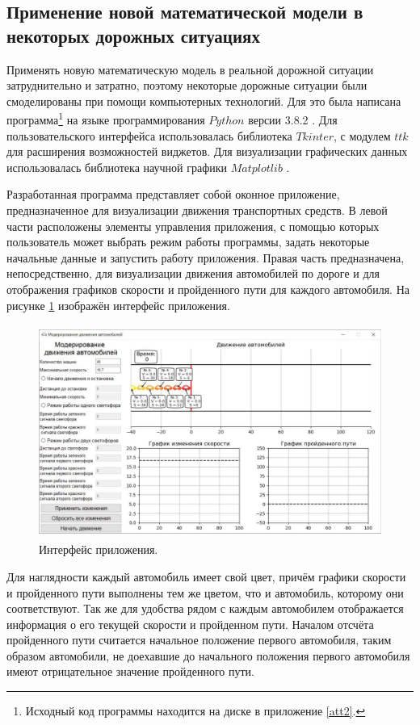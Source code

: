 \documentclass[12pt, a4paper]{extarticle}
\numberwithin{equation}{section}
\numberwithin{figure}{section}
\begin{document}
\subsection{Применение новой математической модели в некоторых дорожных ситуациях}

Применять новую математическую модель в реальной дорожной ситуации затруднительно и затратно, поэтому некоторые дорожные ситуации были смоделированы при помощи компьютерных технологий. Для это была написана программа\footnote{Исходный код программы находится на диске в приложение \ref{att2}.} на языке программирования $Python$ версии 3.8.2 \cite{Python}. Для пользовательского интерфейса использовалась библиотека $Tkinter$, с модулем $ttk$ для расширения возможностей виджетов. Для визуализации графических данных использовалась библиотека научной графики $Matplotlib$ \cite{Matplotlib}.

Разработанная программа представляет собой оконное приложение, предназначенное для визуализации движения транспортных средств. В левой части расположены элементы управления приложения, с помощью которых пользователь может выбрать режим работы программы, задать некоторые начальные данные и запустить работу приложения. Правая часть предназначена, непосредственно, для визуализации движения автомобилей по дороге и для отображения графиков скорости и пройденного пути для каждого автомобиля. На рисунке \ref{window} изображён интерфейс приложения. 

\begin{figure}[h!]  
	\begin{center}
		\includegraphics[keepaspectratio,width=160mm,height=70mm]
		{Images/screens/empty_window.pdf}
	\end{center}
	\caption{Интерфейс приложения.}
	\label{window}
\end{figure}

Для наглядности каждый автомобиль имеет свой цвет, причём графики скорости и пройденного пути выполнены тем же цветом, что и автомобиль, которому они соответствуют. Так же для удобства рядом с каждым автомобилем отображается информация о его текущей скорости и пройденном пути. Началом отсчёта пройденного пути считается начальное положение первого автомобиля, таким образом автомобили, не доехавшие до начального положения первого автомобиля имеют отрицательное значение пройденного пути.
\end{document}
